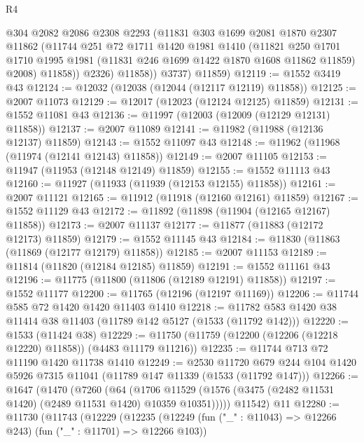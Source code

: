 \begin{lexlean}{R4}
\begin{coremodule}
              @304
              @2082
              @2086
              @2308
              @2293
              (@11831
                @303
                @1699
                @2081
                @1870
                @2307
                @11862
                (@11744
                  @251
                  @72
                  @1711
                  @1420
                  @1981
                  @1410
                  (@11821
                    @250
                    @1701
                    @1710
                    @1995
                    @1981
                    (@11831 @246 @1699 @1422 @1870 @1608 @11862 @11859)
                    @2008)
                  @11858))
              @2326)
            @11858))
        @3737)
      @11859)
@12119 := @1552 @3419 @43
@12124 := @12032 (@12038 (@12044 (@12117 @12119) @11858))
@12125 := @2007 @11073
@12129 := @12017 (@12023 (@12124 @12125) @11859)
@12131 := @1552 @11081 @43
@12136 := @11997 (@12003 (@12009 (@12129 @12131) @11858))
@12137 := @2007 @11089
@12141 := @11982 (@11988 (@12136 @12137) @11859)
@12143 := @1552 @11097 @43
@12148 := @11962 (@11968 (@11974 (@12141 @12143) @11858))
@12149 := @2007 @11105
@12153 := @11947 (@11953 (@12148 @12149) @11859)
@12155 := @1552 @11113 @43
@12160 := @11927 (@11933 (@11939 (@12153 @12155) @11858))
@12161 := @2007 @11121
@12165 := @11912 (@11918 (@12160 @12161) @11859)
@12167 := @1552 @11129 @43
@12172 := @11892 (@11898 (@11904 (@12165 @12167) @11858))
@12173 := @2007 @11137
@12177 := @11877 (@11883 (@12172 @12173) @11859)
@12179 := @1552 @11145 @43
@12184 := @11830 (@11863 (@11869 (@12177 @12179) @11858))
@12185 := @2007 @11153
@12189 := @11814 (@11820 (@12184 @12185) @11859)
@12191 := @1552 @11161 @43
@12196 := @11775 (@11800 (@11806 (@12189 @12191) @11858))
@12197 := @1552 @11177
@12200 := @11765 (@12196 (@12197 @11169))
@12206 := @11744 @585 @72 @1420 @1420 @11403 @1410
@12218 := @11782 @583 @1420 @38 @11414 @38 @11403 (@11789 @142 @5127 (@1533 (@11792 @142)))
@12220 := @1533 (@11424 @38)
@12229 := @11750 (@11759 (@12200 (@12206 (@12218 @12220) @11858)) (@4483 @11179 @11216))
@12235 := @11744 @713 @72 @11190 @1420 @11738 @1410
@12249 := @2530
    @11720
    @679
    @244
    @104
    @1420
    @5926
    @7315
    @11041
    (@11789 @147 @11339 (@1533 (@11792 @147)))
@12266 := @1647
    (@1470
      (@7260
        (@64
          (@1706 @11529 (@1576 (@3475 (@2482 @11531 @1420) (@2489 @11531 @1420) @10359 @10351)))))
      @11542)
    @11
@12280 := @11730
    (@11743
      (@12229
        (@12235
          (@12249 (fun ("_" : @11043) => @12266 @243) (fun ("_" : @11701) => @12266 @103))

\end{coremodule}
\end{lexlean}
